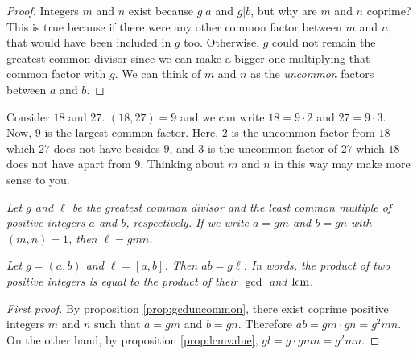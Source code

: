 \documentclass{subfile}
\begin{document}
	\begin{proof}
		Integers $m$ and $n$ exist because $g|a$ and $g|b$, but why are $m$ and $n$ coprime? This is true because if there were any other common factor between $m$ and $n$, that would have been included in $g$ too. Otherwise, $g$ could not remain the greatest common divisor since we can make a bigger one multiplying that common factor with $g$. We can think of $m$ and $n$ as the \textit{uncommon} factors between $a$ and $b$.
	\end{proof}

	\begin{example}
		Consider $18$ and $27$. $(18,27)=9$ and we can write $18=9\cdot2$ and $27=9\cdot3$. Now, $9$ is the largest common factor. Here, $2$ is the uncommon factor from $18$ which $27$ does not have besides $9$, and $3$ is the uncommon factor of $27$ which $18$ does not have apart from $9$. Thinking about $m$ and $n$ in this way may make more sense to you.
	\end{example}

	\begin{proposition}\slshape\label{prop:lcmvalue}
		Let $g$ and $\ell$ be the greatest common divisor and the least common multiple of positive integers $a$ and $b$, respectively. If we write $a=gm$ and $b=gn$ with $(m,n)=1$, then $\ell=gmn$.
	\end{proposition}

	\begin{proposition}\slshape
		Let $g=(a,b)$ and $\ell = [a,b]$. Then $ab=g\ell$. In words, the product of two positive integers is equal to the product of their $\gcd$ and $\operatorname{lcm}$.
	\end{proposition}


	\begin{proof}[First proof]
		By proposition \eqref{prop:gcduncommon}, there exist coprime positive integers $m$ and $n$ such that $a=gm$ and $b=gn$. Therefore $ab=gm\cdot gn=g^2mn$. On the other hand, by proposition \eqref{prop:lcmvalue}, $gl=g\cdot gmn=g^2mn$.
	\end{proof}
\end{document}
